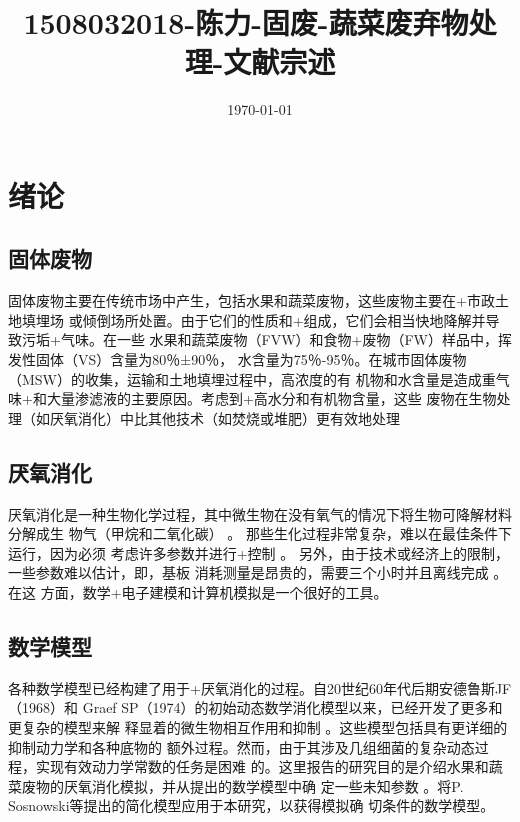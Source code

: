 \documentclass[11pt]{article}
\date{\today}
\title{1508032018-陈力-固废-蔬菜废弃物处理-文献宗述}
\begin{document}
\maketitle
\tableofcontents



\section{绪论}
\label{sec:org5d1832f}
\subsection{固体废物}
\label{sec:orge9c7deb}
固体废物主要在传统市场中产生，包括水果和蔬菜废物，这些废物主要在+市政土地填埋场
或倾倒场所处置。由于它们的性质和+组成，它们会相当快地降解并导致污垢+气味。在一些
水果和蔬菜废物（FVW）和食物+废物（FW）样品中，挥发性固体（VS）含量为80％±90％，
水含量为75％-95％。在城市固体废物（MSW）的收集，运输和土地填埋过程中，高浓度的有
机物和水含量是造成重气味+和大量渗滤液的主要原因。考虑到+高水分和有机物含量，这些
废物在生物处理（如厌氧消化）中比其他技术（如焚烧或堆肥）更有效地处理\cite{sitorus13_biogas_recov_from_anaer_diges}

\subsection{厌氧消化}
\label{sec:org4a37ae4}
厌氧消化是一种生物化学过程，其中微生物在没有氧气的情况下将生物可降解材料分解成生
物气（甲烷和二氧化碳）\cite{84_biogas_produc_utiliz} 。 那些生化过程非常复杂，难以在最佳条件下运行，因为必须
考虑许多参数并进行+控制\cite{deublein10_biogas_waste_renew_resour} 。 另外，由于技术或经济上的限制，一些参数难以估计，即，基板
消耗测量是昂贵的，需要三个小时并且离线完成\cite{carlos-hernandez09_fuzzy_obser_anaer_wwtp} 。在这
方面，数学+电子建模和计算机模拟是一个很好的工具。

\subsection{数学模型}
\label{sec:org43a93e6}
各种数学模型已经构建了用于+厌氧消化的过程。自20世纪60年代后期安德鲁斯JF（1968）和
Graef SP（1974）的初始动态数学消化模型以来，已经开发了更多和更复杂的模型来解
释显着的微生物相互作用和抑制\cite{yu13_mathem_model_anaer_diges_ad} 。这些模型包括具有更详细的抑制动力学和各种底物的
额外过程。然而，由于其涉及几组细菌的复杂动态过程，实现有效动力学常数的任务是困难
的。这里报告的研究目的是介绍水果和蔬菜废物的厌氧消化模拟，并从提出的数学模型中确
定一些未知参数\cite{donoso-bravo11_model_selec_ident_valid_anaer_diges} 。将P. Sosnowski等提出的简化模型应用于本研究，以获得模拟确
切条件的数学模型。
\end{document}
